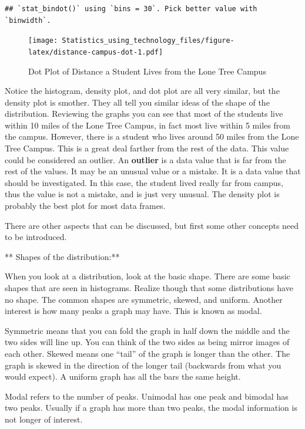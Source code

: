 \documentclass[
]{book}
\begin{document}
\begin{verbatim}
## `stat_bindot()` using `bins = 30`. Pick better value with `binwidth`.
\end{verbatim}

\begin{figure}
\centering
\texttt{[image: Statistics\_using\_technology\_files/figure-latex/distance-campus-dot-1.pdf]}
\caption{\label{fig:distance-campus-dot}Dot Plot of Distance a Student Lives from the Lone Tree Campus}
\end{figure}

Notice the histogram, density plot, and dot plot are all very similar, but the density plot is smother. They all tell you similar ideas of the shape of the distribution. Reviewing the graphs you can see that most of the students live within 10 miles of the Lone Tree Campus, in fact most live within 5 miles from the campus. However, there is a student who lives around 50 miles from the Lone Tree Campus. This is a great deal farther from the rest of the data. This value could be considered an outlier. An \textbf{outlier} is a data value that is far from the rest of the values. It may be an unusual value or a mistake. It is a data value that should be investigated. In this case, the student lived really far from campus, thus the value is not a mistake, and is just very unusual. The density plot is probably the best plot for most data frames.

There are other aspects that can be discussed, but first some other concepts need to be introduced.

** Shapes of the distribution:**

When you look at a distribution, look at the basic shape. There are some basic shapes that are seen in histograms. Realize though that some distributions have no shape. The common shapes are symmetric, skewed,
and uniform. Another interest is how many peaks a graph may have. This is known as modal.

Symmetric means that you can fold the graph in half down the middle and the two sides will line up. You can think of the two sides as being mirror images of each other. Skewed means one ``tail'' of the graph is
longer than the other. The graph is skewed in the direction of the longer tail (backwards from what you would expect). A uniform graph has all the bars the same height.

Modal refers to the number of peaks. Unimodal has one peak and bimodal has two peaks. Usually if a graph has more than two peaks, the modal information is not longer of interest.
\end{document}
